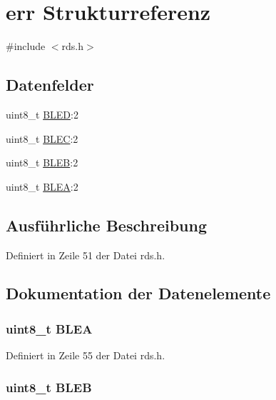\hypertarget{structerr}{}\section{err Strukturreferenz}
\label{structerr}


{\ttfamily \#include $<$rds.\+h$>$}

\subsection*{Datenfelder}
\begin{DoxyCompactItemize}
\item 
uint8\+\_\+t \hyperlink{structerr_a3498d51c8fc84119a00242f7bb9b6719}{B\+L\+E\+D}\+:2
\item 
uint8\+\_\+t \hyperlink{structerr_a279b7213c9f5034e0fa7aa8d9c2bc9a2}{B\+L\+E\+C}\+:2
\item 
uint8\+\_\+t \hyperlink{structerr_aadd978be8508790bbf25c9a488ea553c}{B\+L\+E\+B}\+:2
\item 
uint8\+\_\+t \hyperlink{structerr_a22256b3ddf2070027c87504d1de20c2f}{B\+L\+E\+A}\+:2
\end{DoxyCompactItemize}


\subsection{Ausführliche Beschreibung}


Definiert in Zeile 51 der Datei rds.\+h.



\subsection{Dokumentation der Datenelemente}
\hypertarget{structerr_a22256b3ddf2070027c87504d1de20c2f}{}
\subsubsection[{B\+L\+E\+A}]{\setlength{\rightskip}{0pt plus 5cm}uint8\+\_\+t B\+L\+E\+A}\label{structerr_a22256b3ddf2070027c87504d1de20c2f}


Definiert in Zeile 55 der Datei rds.\+h.

\hypertarget{structerr_aadd978be8508790bbf25c9a488ea553c}{}
\subsubsection[{B\+L\+E\+B}]{\setlength{\rightskip}{0pt plus 5cm}uint8\+\_\+t B\+L\+E\+B}\label{structerr_aadd978be8508790bbf25c9a488ea553c}


